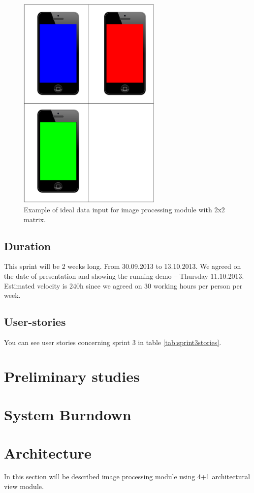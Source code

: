 \begin{figure}[H]
	\centering
		\includegraphics[width=7cm]{sprint3/sprint3_goal.pdf}
	\caption{Example of ideal data input for image processing module with 2x2 matrix.}
	\label{img:sprint3_goal}
\end{figure}

\subsection{Duration}
This sprint will be 2 weeks long. From 30.09.2013 to 13.10.2013.
We agreed on the date of presentation and showing the running demo -- Thursday 11.10.2013.
Estimated velocity is 240h since we agreed on 30 working hours per person per week.

\subsection{User-stories}
You can see user stories concerning sprint 3 in table \ref{tab:sprint3stories}.

\section{Preliminary studies}

\section{System Burndown}
\section{Architecture}
In this section will be described image processing module using 4+1 architectural view module.

